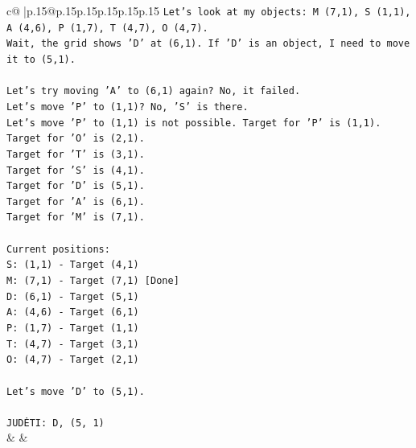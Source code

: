\documentclass{article}
\begin{document}
{\begin{supertabular}{c@{$\;$}|p{.15\linewidth}@{}p{.15\linewidth}p{.15\linewidth}p{.15\linewidth}p{.15\linewidth}p{.15\linewidth}}
{{{\texttt{Let's look at my objects: M (7,1), S (1,1), A (4,6), P (1,7), T (4,7), O (4,7).} \\
\texttt{Wait, the grid shows 'D' at (6,1). If 'D' is an object, I need to move it to (5,1).} \\
\\ 
\texttt{Let's try moving 'A' to (6,1) again? No, it failed.} \\
\texttt{Let's move 'P' to (1,1)? No, 'S' is there.} \\
\texttt{Let's move 'P' to (1,1) is not possible. Target for 'P' is (1,1).} \\
\texttt{Target for 'O' is (2,1).} \\
\texttt{Target for 'T' is (3,1).} \\
\texttt{Target for 'S' is (4,1).} \\
\texttt{Target for 'D' is (5,1).} \\
\texttt{Target for 'A' is (6,1).} \\
\texttt{Target for 'M' is (7,1).} \\
\\ 
\texttt{Current positions:} \\
\texttt{S: (1,1) {-} Target (4,1)} \\
\texttt{M: (7,1) {-} Target (7,1) {[}Done{]}} \\
\texttt{D: (6,1) {-} Target (5,1)} \\
\texttt{A: (4,6) {-} Target (6,1)} \\
\texttt{P: (1,7) {-} Target (1,1)} \\
\texttt{T: (4,7) {-} Target (3,1)} \\
\texttt{O: (4,7) {-} Target (2,1)} \\
\\ 
\texttt{Let's move 'D' to (5,1).} \\
\\ 
\texttt{JUDĖTI: D, (5, 1)} \\
            }
        }
    }
    & & \\ \\


\end{supertabular}}
\end{document}
